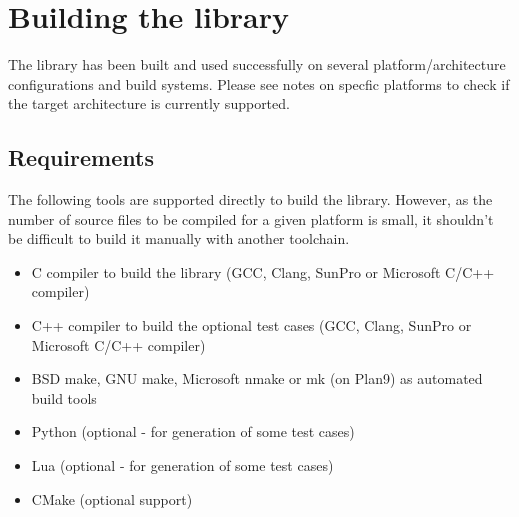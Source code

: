 %
%
%
%

\newpage
\section{Building the library}

The library has been built and used successfully on several 
platform/architecture configurations and build systems.
Please see notes on specfic platforms to check if the target
architecture is currently supported.


\subsection{Requirements}

The following tools are supported directly to build the  library.
However, as the number of source files to be compiled for a given
platform is small, it shouldn't be difficult to build it manually with
another toolchain.
\begin{itemize}
\item C compiler to build the  library (GCC, Clang, SunPro or Microsoft C/C++ compiler)
\item C++ compiler to build the optional test cases (GCC, Clang, SunPro or Microsoft C/C++ compiler)
\item BSD make, GNU make, Microsoft nmake or mk (on Plan9) as automated build tools
\item Python (optional - for generation of some test cases)
\item Lua (optional - for generation of some test cases)
\item CMake (optional support)
\end{itemize}


